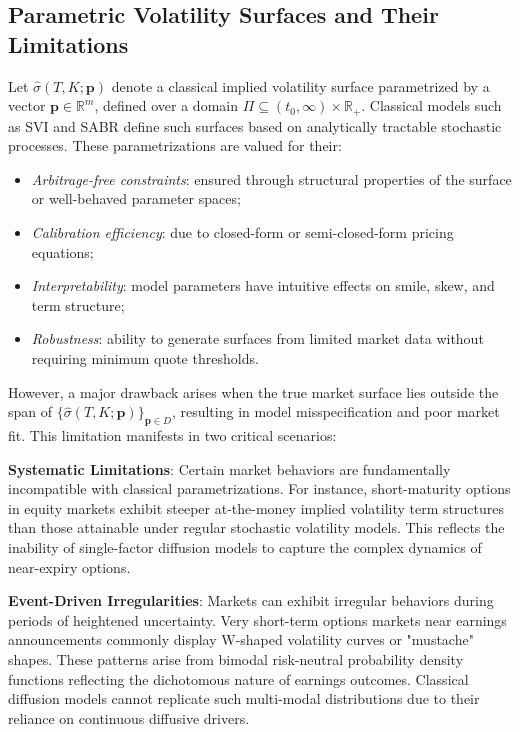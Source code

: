 \subsection{Parametric Volatility Surfaces and Their Limitations}

Let $\hat{\sigma}(T, K; \mathbf{p})$ denote a classical implied volatility surface parametrized by a vector $\mathbf{p} \in \mathbb{R}^m$, defined over a domain $\Pi \subseteq (t_0, \infty) \times \mathbb{R}_+$.
Classical models such as SVI and SABR define such surfaces based on analytically tractable stochastic processes.
These parametrizations are valued for their:

\begin{itemize}
    \item \textit{Arbitrage-free constraints}: ensured through structural properties of the surface or well-behaved parameter spaces;
    \item \textit{Calibration efficiency}: due to closed-form or semi-closed-form pricing equations;
    \item \textit{Interpretability}: model parameters have intuitive effects on smile, skew, and term structure;
    \item \textit{Robustness}: ability to generate surfaces from limited market data without requiring minimum quote thresholds.
\end{itemize}

However, a major drawback arises when the true market surface lies outside the span of $\{\hat{\sigma}(T,K; \mathbf{p})\}_{\mathbf{p} \in D}$, resulting in model misspecification and poor market fit.
This limitation manifests in two critical scenarios:

\textbf{Systematic Limitations}: Certain market behaviors are fundamentally incompatible with classical parametrizations. For instance, short-maturity options in equity markets exhibit steeper at-the-money implied volatility term structures than those attainable under regular stochastic volatility models. This reflects the inability of single-factor diffusion models to capture the complex dynamics of near-expiry options.

\textbf{Event-Driven Irregularities}: Markets can exhibit irregular behaviors during periods of heightened uncertainty. Very short-term options markets near earnings announcements commonly display W-shaped volatility curves or "mustache" shapes. These patterns arise from bimodal risk-neutral probability density functions reflecting the dichotomous nature of earnings outcomes. Classical diffusion models cannot replicate such multi-modal distributions due to their reliance on continuous diffusive drivers.

